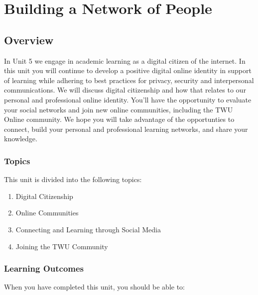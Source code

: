 \documentclass[
]{book}
\providecommand{\tightlist}{%
  \setlength{\itemsep}{0pt}\setlength{\parskip}{0pt}}
\theoremstyle{definition}
\theoremstyle{definition}
\theoremstyle{definition}
\theoremstyle{definition}
\theoremstyle{remark}
\begin{document}
\hypertarget{building-a-network-of-people}{%
\chapter{Building a Network of People}\label{building-a-network-of-people}}

\hypertarget{overview-4}{%
\section*{Overview}\label{overview-4}}

In Unit 5 we engage in academic learning as a digital citizen of the internet. In this unit you will continue to develop a positive digital online identity in support of learning while adhering to best practices for privacy, security and interpersonal communications. We will discuss digital citizenship and how that relates to our personal and professional online identity. You'll have the opportunity to evaluate your social networks and join new online communities, including the TWU Online community.
We hope you will take advantage of the opportunties to connect, build your personal and professional learning networks, and share your knowledge.

\hypertarget{topics-4}{%
\subsection*{Topics}\label{topics-4}}

This unit is divided into the following topics:

\begin{enumerate}
\def\labelenumi{\arabic{enumi}.}
\tightlist
\item
  Digital Citizenship
\item
  Online Communities
\item
  Connecting and Learning through Social Media
\item
  Joining the TWU Community
\end{enumerate}

\hypertarget{learning-outcomes-4}{%
\subsection*{Learning Outcomes}\label{learning-outcomes-4}}

When you have completed this unit, you should be able to:
\end{document}
